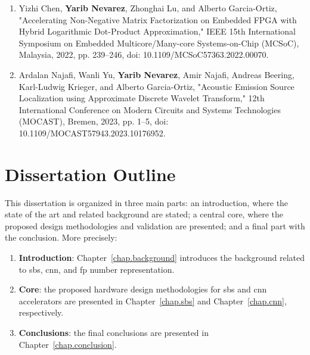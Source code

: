 \begin{enumerate}
	\item Yizhi Chen, \textbf{Yarib Nevarez}, Zhonghai Lu, and Alberto Garcia-Ortiz, "Accelerating Non-Negative Matrix Factorization on Embedded FPGA with Hybrid Logarithmic Dot-Product Approximation," 
	 IEEE 15th International Symposium on Embedded Multicore/Many-core Systems-on-Chip (MCSoC), Malaysia, 2022, pp. 239--246, doi: 10.1109/MCSoC57363.2022.00070.
	
	\item Ardalan Najafi, Wanli Yu, \textbf{Yarib Nevarez}, Amir Najafi, Andreas Beering, Karl-Ludwig Krieger, and Alberto Garcia-Ortiz, "Acoustic Emission Source Localization using Approximate Discrete Wavelet Transform,"  12th International Conference on Modern Circuits and Systems Technologies (MOCAST), Bremen, 2023, pp. 1--5, doi: 10.1109/MOCAST57943.2023.10176952.
	
\end{enumerate}

\section{Dissertation Outline}

This dissertation is organized in three main parts: an introduction, where
the state of the art and related background are stated; a central core, where the proposed design methodologies and validation are presented; and a final part with the conclusion. More precisely:

\begin{enumerate}[I]
	\item \textbf{Introduction}: Chapter~\ref{chap.background} introduces the background related to \gls{sbs}, \gls{cnn}, and \gls{fp} number representation.
	\item \textbf{Core}: the proposed hardware design methodologies for \gls{sbs} and \gls{cnn} accelerators are presented in Chapter~\ref{chap.sbs} and Chapter~\ref{chap.cnn}, respectively.
	\item \textbf{Conclusions}: the final conclusions are presented in Chapter~\ref{chap.conclusion}.
\end{enumerate}